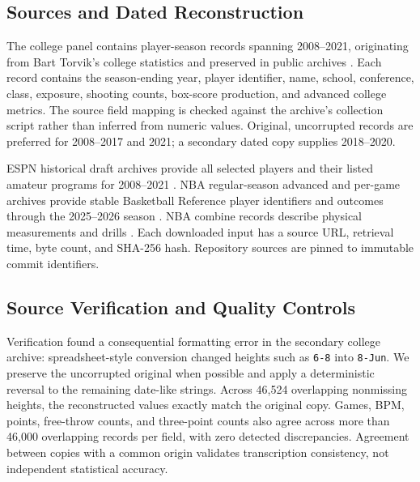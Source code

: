 \documentclass[11pt]{article}
\begin{document}
\subsection{Sources and Dated Reconstruction}
The college panel contains \CollegeN{} player-season records spanning 2008--2021, originating from Bart Torvik's college statistics and preserved in public archives \cite{gonzaga,torvik,archive}. Each record contains the season-ending year, player identifier, name, school, conference, class, exposure, shooting counts, box-score production, and advanced college metrics. The source field mapping is checked against the archive's collection script rather than inferred from numeric values. Original, uncorrupted records are preferred for 2008--2017 and 2021; a secondary dated copy supplies 2018--2020.

ESPN historical draft archives provide all selected players and their listed amateur programs for 2008--2021 \cite{espn}. NBA regular-season advanced and per-game archives provide stable Basketball Reference player identifiers and outcomes through the 2025--2026 season \cite{archive,bref}. NBA combine records describe physical measurements and drills \cite{nba}. Each downloaded input has a source URL, retrieval time, byte count, and SHA-256 hash. Repository sources are pinned to immutable commit identifiers.

\subsection{Source Verification and Quality Controls}
Verification found a consequential formatting error in the secondary college archive: spreadsheet-style conversion changed heights such as \texttt{6-8} into \texttt{8-Jun}. We preserve the uncorrupted original when possible and apply a deterministic reversal to the remaining date-like strings. Across 46,524 overlapping nonmissing heights, the reconstructed values exactly match the original copy. Games, BPM, points, free-throw counts, and three-point counts also agree across more than 46,000 overlapping records per field, with zero detected discrepancies. Agreement between copies with a common origin validates transcription consistency, not independent statistical accuracy.
\end{document}
